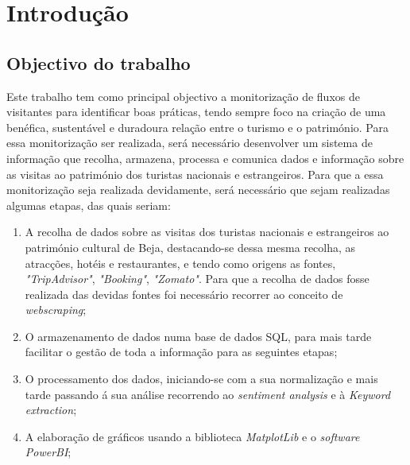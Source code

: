 \chapter{Introdução}
\label{intro}


\section{Objectivo do trabalho}
Este trabalho tem como principal objectivo a monitorização de fluxos de visitantes para identificar boas práticas, tendo sempre foco na criação de uma benéfica, sustentável e duradoura relação entre o turismo e o património. Para essa monitorização ser realizada, será necessário desenvolver um sistema de informação que recolha, armazena, processa e comunica dados e informação sobre as visitas ao património dos turistas nacionais e estrangeiros. Para que a essa monitorização seja realizada devidamente, será necessário que sejam realizadas algumas etapas, das quais seriam:

\begin{enumerate}
    \item A recolha de dados sobre as visitas dos turistas nacionais e estrangeiros ao património cultural de Beja, destacando-se dessa mesma recolha, as atracções, hotéis e restaurantes, e tendo como origens as fontes,  \textit{"TripAdvisor"}, \textit{"Booking"}, \textit{"Zomato"}. Para que a recolha de dados fosse realizada das devidas fontes foi necessário recorrer ao conceito de \textit{webscraping};
    \item O armazenamento de dados numa base de dados SQL, para mais tarde facilitar o gestão de toda a informação para as seguintes etapas;
    \item O processamento dos dados, iniciando-se com a sua normalização e mais tarde passando á sua análise recorrendo ao \textit{sentiment analysis} e à \textit{Keyword extraction};
    \item A elaboração de gráficos usando a biblioteca  \textit{MatplotLib} e o  \textit{software PowerBI};
\end{enumerate} 

